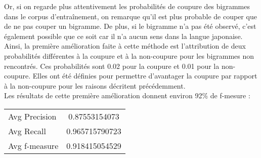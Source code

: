 Or, si on regarde plus attentivement les probabilités de coupure des bigrammes dans le corpus d'entraînement, on remarque qu'il est plus probable de couper que de ne pas couper un bigramme. De plus, si le bigramme n'a pas été observé, c'est également possible que ce soit car il n'a aucun sens dans la langue japonaise. \\

Ainsi, la première amélioration faite à cette méthode est l'attribution de deux probabilités différentes à la coupure et à la non-coupure pour les bigrammes non rencontrés. Ces probabilités sont 0.02 pour la coupure et 0.01 pour la non-coupure. Elles ont été définies pour permettre d'avantager la coupure par rapport à la non-coupure pour les raisons décritent précédemment. \\

Les résultats de cette première amélioration donnent environ 92\% de f-mesure :
\begin{center}
	\begin{tabular}{|l c|}
	  	\hline
	  	Avg Precision & 0.87553154073 \\
		Avg Recall & 0.965715790723 \\
		Avg f-measure & 0.918415054529 \\
	  	\hline
	\end{tabular}
\end{center}
